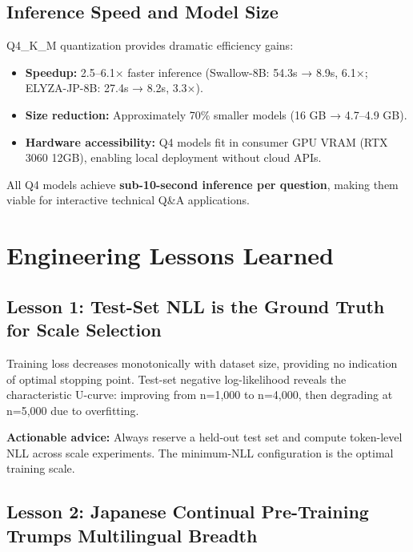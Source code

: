 \documentclass[twocolumn]{article}
\begin{document}
\subsection{Inference Speed and Model Size}

Q4\_K\_M quantization provides dramatic efficiency gains:
\begin{itemize}
  \item \textbf{Speedup:} 2.5--6.1$\times$ faster inference (Swallow-8B: 54.3s → 8.9s,
        6.1$\times$; ELYZA-JP-8B: 27.4s → 8.2s, 3.3$\times$).
  \item \textbf{Size reduction:} Approximately 70\% smaller models (16 GB → 4.7--4.9 GB).
  \item \textbf{Hardware accessibility:} Q4 models fit in consumer GPU VRAM (RTX 3060 12GB),
        enabling local deployment without cloud APIs.
\end{itemize}

All Q4 models achieve \textbf{sub-10-second inference per question}, making them viable
for interactive technical Q\&A applications.

\section{Engineering Lessons Learned}
\label{sec:lessons}

\subsection{Lesson 1: Test-Set NLL is the Ground Truth for Scale Selection}

Training loss decreases monotonically with dataset size, providing no indication of
optimal stopping point.
Test-set negative log-likelihood reveals the characteristic U-curve: improving from
n=1,000 to n=4,000, then degrading at n=5,000 due to overfitting.

\textbf{Actionable advice:} Always reserve a held-out test set and compute token-level NLL
across scale experiments. The minimum-NLL configuration is the optimal training scale.

\subsection{Lesson 2: Japanese Continual Pre-Training Trumps Multilingual Breadth}
\end{document}
